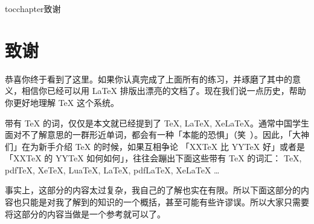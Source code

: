 
\newenvironment{theacknowledgements}{\wuhao\song}

\addcontentsline{toc}{chapter}{致谢}%
\chapter*{\centering\xiaosan\song\bfseries 致\quad 谢}

\begin{theacknowledgements}
    恭喜你终于看到了这里。如果你认真完成了上面所有的练习，并琢磨了其中的意义，相信你已经可以用 LaTeX 排版出漂亮的文档了。现在我们说一点历史，帮助你更好地理解 TeX 这个系统。

    带有 TeX 的词，仅仅是本文就已经提到了 TeX, LaTeX, XeLaTeX。通常中国学生面对不了解意思的一群形近单词，都会有一种「本能的恐惧」（笑~）。因此，「大神们」在为新手介绍 TeX 的时候，如果互相争论 「XXTeX 比 YYTeX 好」或者是「XXTeX 的 YYTeX 如何如何」，往往会蹦出下面这些带有 TeX 的词汇：
    TeX, pdfTeX, XeTeX, LuaTeX, LaTeX, pdfLaTeX, XeLaTeX …
    
    事实上，这部分的内容太过复杂，我自己的了解也实在有限。所以下面这部分的内容也只能是对我了解到的知识的一个概括，甚至可能有些许谬误。所以大家只需要将这部分的内容当做是一个参考就可以了。
    
\par

\end{theacknowledgements}





